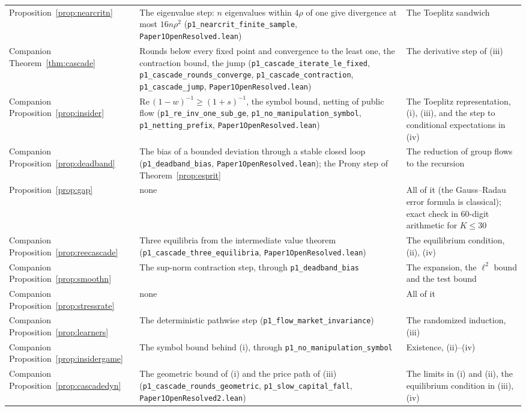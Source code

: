 \begin{longtable}{>{\raggedright\arraybackslash}p{}>{\raggedright\arraybackslash}p{}>{\raggedright\arraybackslash}p{}}
Proposition~\ref{prop:nearcritn} & The eigenvalue step: $n$ eigenvalues within $4\rho$ of one give divergence at most $16n\rho^2$ (\texttt{p1\_nearcrit\_finite\_sample}, \nolinkurl{Paper1OpenResolved.lean}) & The Toeplitz sandwich\\
Companion Theorem~\ref{thm:cascade} & Rounds below every fixed point and convergence to the least one, the contraction bound, the jump (\texttt{p1\_cascade\_iterate\_le\_fixed}, \texttt{p1\_cascade\_rounds\_converge}, \texttt{p1\_cascade\_contraction}, \texttt{p1\_cascade\_jump}, \nolinkurl{Paper1OpenResolved.lean}) & The derivative step of (iii)\\
Companion Proposition~\ref{prop:insider} & $\mathrm{Re}\,(1-w)^{-1}\ge(1+s)^{-1}$, the symbol bound, netting of public flow (\texttt{p1\_re\_inv\_one\_sub\_ge}, \texttt{p1\_no\_manipulation\_symbol}, \texttt{p1\_netting\_prefix}, \nolinkurl{Paper1OpenResolved.lean}) & The Toeplitz representation, (i), (iii), and the step to conditional expectations in (iv)\\
Companion Proposition~\ref{prop:deadband} & The bias of a bounded deviation through a stable closed loop (\texttt{p1\_deadband\_bias}, \nolinkurl{Paper1OpenResolved.lean}); the Prony step of Theorem~\ref{prop:esprit} & The reduction of group flows to the recursion\\
Proposition~\ref{prop:gap} & none & All of it (the Gauss--Radau error formula is classical); exact check in 60-digit arithmetic for $K\le30$\\
Companion Proposition~\ref{prop:reecascade} & Three equilibria from the intermediate value theorem (\texttt{p1\_cascade\_three\_equilibria}, \nolinkurl{Paper1OpenResolved.lean}) & The equilibrium condition, (ii), (iv)\\
Companion Proposition~\ref{prop:smoothn} & The sup-norm contraction step, through \texttt{p1\_deadband\_bias} & The expansion, the $\ell^2$ bound and the test bound\\
Companion Proposition~\ref{prop:stressrate} & none & All of it\\
Companion Proposition~\ref{prop:learners} & The deterministic pathwise step (\texttt{p1\_flow\_market\_invariance}) & The randomized induction, (iii)\\
Companion Proposition~\ref{prop:insidergame} & The symbol bound behind (i), through \texttt{p1\_no\_manipulation\_symbol} & Existence, (ii)--(iv)\\
Companion Proposition~\ref{prop:cascadedyn} & The geometric bound of (i) and the price path of (iii) (\texttt{p1\_cascade\_rounds\_geometric}, \texttt{p1\_slow\_capital\_fall}, \nolinkurl{Paper1OpenResolved2.lean}) & The limits in (i) and (ii), the equilibrium condition in (iii), (iv)\\

\end{longtable}
